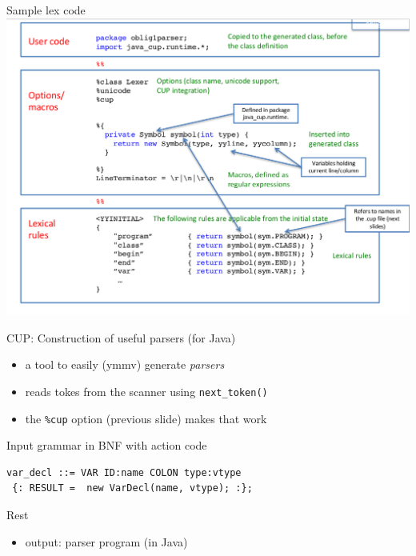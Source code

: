 \documentclass{beamer}
\begin{document}
\begin{frame}[label={sec:orga8ba78b}]{Sample lex code}
\includegraphics[width=\textwidth]{figures/snaps/lexcode}
\end{frame}



\begin{frame}[label={sec:orgcf092e0},fragile]{CUP: Construction of useful parsers (for Java)}
 \begin{itemize}
\item a tool to easily (ymmv) generate \emph{parsers}

\item reads tokes from the scanner using \texttt{next\_token()}
\item the \texttt{\%cup} option (previous slide) makes that work
\end{itemize}



\begin{block}{Input}
grammar in BNF with \alert{action} code

\begin{verbatim}
var_decl ::= VAR ID:name COLON type:vtype
 {: RESULT =  new VarDecl(name, vtype); :};
\end{verbatim}
\end{block}


\begin{block}{Rest}
\begin{itemize}
\item \alert{output}: parser program (in Java)
\end{itemize}
\end{block}
\end{frame}
\end{document}
